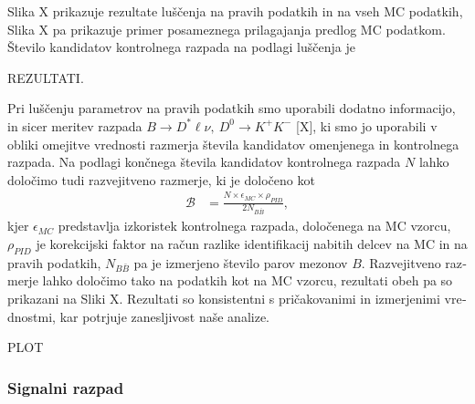 \begin{otherlanguage}{slovene}
Slika X prikazuje rezultate luščenja na pravih podatkih in na vseh MC podatkih, Slika X pa prikazuje primer posameznega prilagajanja predlog MC podatkom. Število kandidatov kontrolnega razpada na podlagi luščenja je

REZULTATI.

Pri luščenju parametrov na pravih podatkih smo uporabili dodatno informacijo, in sicer meritev razpada $B\to D^* \ell \nu,~D^0 \to K^+K^-$ [X], ki smo jo uporabili v obliki omejitve vrednosti razmerja števila kandidatov omenjenega in kontrolnega razpada. Na podlagi končnega števila kandidatov kontrolnega razpada $N$ lahko določimo tudi razvejitveno razmerje, ki je določeno kot
\begin{align}
\mathcal{B} &= \frac{N \times \epsilon_{MC} \times \rho_{PID}}{2N_{B\bar B}},
\label{eq:br_data_si}
\end{align}
kjer $\epsilon_{MC}$ predstavlja izkoristek kontrolnega razpada, določenega na MC vzorcu, $\rho_{PID}$ je korekcijski faktor na račun razlike identifikacij nabitih delcev na MC in na pravih podatkih, $N_{B\bar B}$ pa je izmerjeno število parov mezonov $B$. Razvejitveno razmerje lahko določimo tako na podatkih kot na MC vzorcu, rezultati obeh pa so prikazani na Sliki X. Rezultati so konsistentni s pričakovanimi in izmerjenimi vrednostmi, kar potrjuje zanesljivost naše analize.

PLOT

\subsubsection{Signalni razpad}


\end{otherlanguage}
